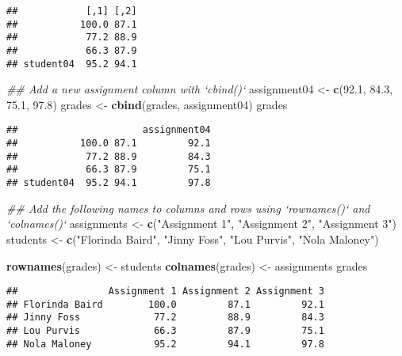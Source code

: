 \documentclass[
]{article}
\newenvironment{Shaded}{\begin{snugshade}}{\end{snugshade}}
\newcommand{\CommentTok}[1]{\textcolor[rgb]{0.56,0.35,0.01}{\textit{#1}}}
\newcommand{\FloatTok}[1]{\textcolor[rgb]{0.00,0.00,0.81}{#1}}
\newcommand{\KeywordTok}[1]{\textcolor[rgb]{0.13,0.29,0.53}{\textbf{#1}}}
\newcommand{\NormalTok}[1]{#1}
\newcommand{\StringTok}[1]{\textcolor[rgb]{0.31,0.60,0.02}{#1}}
\begin{document}
\begin{verbatim}
##            [,1] [,2]
##           100.0 87.1
##            77.2 88.9
##            66.3 87.9
## student04  95.2 94.1
\end{verbatim}

\begin{Shaded}
\begin{Highlighting}[]
\CommentTok{## Add a new assignment column with `cbind()`}
\NormalTok{assignment04 <-}\StringTok{ }\KeywordTok{c}\NormalTok{(}\FloatTok{92.1}\NormalTok{, }\FloatTok{84.3}\NormalTok{, }\FloatTok{75.1}\NormalTok{, }\FloatTok{97.8}\NormalTok{)}
\NormalTok{grades <-}\StringTok{ }\KeywordTok{cbind}\NormalTok{(grades, assignment04)}
\NormalTok{grades}
\end{Highlighting}
\end{Shaded}

\begin{verbatim}
##                      assignment04
##           100.0 87.1         92.1
##            77.2 88.9         84.3
##            66.3 87.9         75.1
## student04  95.2 94.1         97.8
\end{verbatim}

\begin{Shaded}
\begin{Highlighting}[]
\CommentTok{## Add the following names to columns and rows using `rownames()` and `colnames()`}
\NormalTok{assignments <-}\StringTok{ }\KeywordTok{c}\NormalTok{(}\StringTok{"Assignment 1"}\NormalTok{, }\StringTok{"Assignment 2"}\NormalTok{, }\StringTok{"Assignment 3"}\NormalTok{)}
\NormalTok{students <-}\StringTok{ }\KeywordTok{c}\NormalTok{(}\StringTok{"Florinda Baird"}\NormalTok{, }\StringTok{"Jinny Foss"}\NormalTok{, }\StringTok{"Lou Purvis"}\NormalTok{, }\StringTok{"Nola Maloney"}\NormalTok{)}

\KeywordTok{rownames}\NormalTok{(grades) <-}\StringTok{ }\NormalTok{students}
\KeywordTok{colnames}\NormalTok{(grades) <-}\StringTok{ }\NormalTok{assignments}
\NormalTok{grades}
\end{Highlighting}
\end{Shaded}

\begin{verbatim}
##                Assignment 1 Assignment 2 Assignment 3
## Florinda Baird        100.0         87.1         92.1
## Jinny Foss             77.2         88.9         84.3
## Lou Purvis             66.3         87.9         75.1
## Nola Maloney           95.2         94.1         97.8
\end{verbatim}
\end{document}
